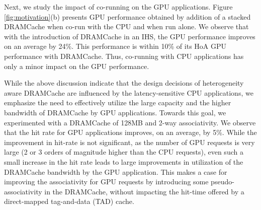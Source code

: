 \par Next, we study the impact of co-running on the GPU applications. Figure \ref{fig:motivation}(b) presents GPU performance obtained by addition of a stacked DRAMCache when co-run with the CPU and when run alone.
We observe that with the introduction of DRAMCache in an IHS, the GPU performance improves on an average by 24\%. This performance is within 10\% of its HoA GPU performance with DRAMCache. 
Thus, co-running with CPU applications has only a minor impact on the GPU performance. 

While the above discussion indicate that the design decisions of heterogeneity aware DRAMCache are influenced by the latency-sensitive CPU applications, we emphasize the need to effectively utilize the large capacity and the higher bandwidth of DRAMCache by GPU applications. Towards this goal, we experimented with a DRAMCache of 128MB and 2-way associativity. We observe that the hit rate for GPU applications improves, on an average, by 5\%. While the improvement in hit-rate is not significant, as the number of GPU requests is very large (2 or 3 orders of magnitude higher than the CPU requests), even such a small increase in the hit rate leads to large improvements in utilization of the DRAMCache bandwidth by the GPU application. This makes a case for improving the associativity for GPU requests by introducing some pseudo-associativity in the DRAMCache, without impacting the hit-time offered by a direct-mapped tag-and-data (TAD) cache.

